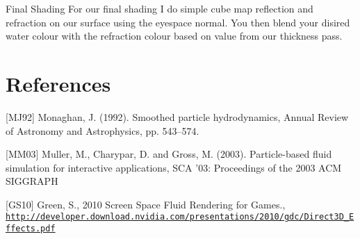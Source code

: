 \begin{DoxyEnumerate}
\item Final Shading For our final shading I do simple cube map reflection and refraction on our surface using the eyespace normal. You then blend your disired water colour with the refraction colour based on value from our thickness pass.\par
  
\end{DoxyEnumerate}

\section*{References }

\mbox{[}M\-J92\mbox{]} Monaghan, J. (1992). Smoothed particle hydrodynamics, Annual Review of Astronomy and Astrophysics, pp. 543–574.\par
\mbox{[}M\-M03\mbox{]} Muller, M., Charypar, D. and Gross, M. (2003). Particle-\/based fluid simulation for interactive applications, S\-C\-A ’03\-: Proceedings of the 2003 A\-C\-M S\-I\-G\-G\-R\-A\-P\-H\par
\mbox{[}G\-S10\mbox{]} Green, S., 2010 Screen Space Fluid Rendering for Games., \href{http://developer.download.nvidia.com/presentations/2010/gdc/Direct3D_Effects.pdf}{\tt http\-://developer.\-download.\-nvidia.\-com/presentations/2010/gdc/\-Direct3\-D\-\_\-\-Effects.\-pdf}\par
